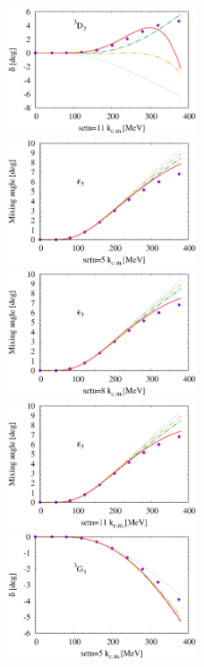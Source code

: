 \documentclass{article}
\begin{document}
\begin{figure}[htbp]
\includegraphics[width=0.5\textwidth]{11_3d3.eps}
\includegraphics[width=0.5\textwidth]{5_e3.eps}
\includegraphics[width=0.5\textwidth]{8_e3.eps}
\includegraphics[width=0.5\textwidth]{11_e3.eps}
\includegraphics[width=0.5\textwidth]{5_3g3.eps}

\end{figure}
\end{document}

